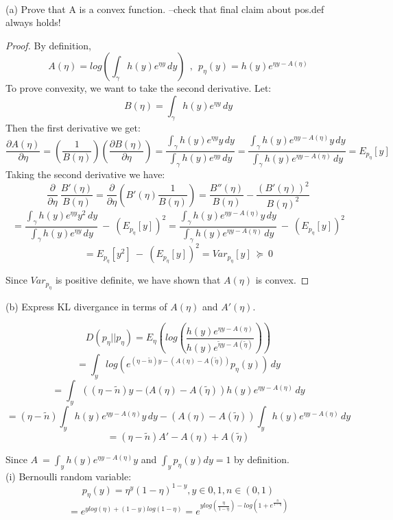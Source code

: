 \documentclass[11pt]{article}
\newenvironment{problem}[2][Problem]{\begin{trivlist}
\item[\hskip \labelsep {\bfseries #1}\hskip \labelsep {\bfseries #2.}]}{\end{trivlist}}
\begin{document}
\begin{problem}{2.2}
\text{ }\\

{\color{red}(a) Prove that A is a convex function. --check that final claim about pos.def always holds!}
\begin{proof}
By definition, 
\[ A(\eta) = log(\int_\gamma h(y)e^{\eta y}\,dy )~~,~~p_{\eta}(y) = h(y)e^{\eta y-A(\eta)} \]
To prove convexity, we want to take the second derivative. Let:
\[B(\eta) = \int_\gamma h(y)e^{\eta y}\,dy \]
Then the first derivative we get:
\[ \frac{\partial A(\eta)}{\partial \eta}
   = \left( \frac{1}{B(\eta)}\right)
     \left(\frac{\partial B(\eta)}{\partial \eta}\right) 
   = \frac{\int_\gamma h(y)e^{\eta y} y \,dy}{\int_\gamma h(y)e^{\eta y}\,dy}
   = \frac{\int_\gamma h(y)e^{\eta y - A(\eta)} y \,dy}{\int_\gamma h(y)e^{\eta y - A(\eta)}\,dy}
   =E_{p_{\eta}}[y]\]
Taking the second derivative we have:
\[ \frac{\partial}{\partial \eta}~\frac{B'(\eta)}{B(\eta)}
   = \frac{\partial}{\partial \eta}\left( B'(\eta)\frac{1}{B(\eta)}\right)
   = \frac{B''(\eta)}{B(\eta)} - \frac{(B'(\eta))^2}{B(\eta)^2}\]
\[= \frac{\int_\gamma h(y)e^{\eta y} y^2 \,dy}{\int_\gamma h(y)e^{\eta y}\,dy}~-~(E_{p_{\eta}}[y])^2
   = \frac{\int_\gamma h(y)e^{\eta y - A(\eta)} y \,dy}{\int_\gamma h(y)e^{\eta y - A(\eta)}\,dy}~-~(E_{p_{\eta}}[y])^2\]
\[ = E_{p_{\eta}}[y^2]~-~(E_{p_{\eta}}[y])^2 
   = Var_{p_{\eta}}[y] ~\succeq~0 \]

Since $Var_{p_{\eta}}$ is positive definite, we have shown that $A(\eta)$ is convex.
\end{proof}

(b) Express KL divergance in terms of $A(\eta)$ and $A'(\eta)$. 

\[ D(p_{\eta} || p_{\eta}) = E_{\eta} \left(log(\frac{h(y)e^{\eta y - A(\eta)}}{h(y)e^{\tilde \eta y - A(\tilde \eta)}})\right)\]
\[= \int_y log \left(e^{(\eta - \tilde{n})y - (A(\eta) - A(\tilde{\eta}))} p_{\eta}(y) \right) \,dy \]
\[= \int_y \left((\eta - \tilde{n})y - (A(\eta) - A(\tilde{\eta})\right) h(y)e^{\eta y - A(\eta)} \,dy \]
\[= (\eta - \tilde{n})\int_y h(y)e^{\eta y - A(\eta)}y \,dy - (A(\eta) - A(\tilde{\eta})) \int_y h(y)e^{\eta y - A(\eta)} \,dy \]
\[= (\eta - \tilde{n})A' - A(\eta) + A(\tilde{\eta}) \]

Since $A\ = \int_y h(y)e^{\eta y - A(\eta)}y $ and $\int_y p_{\eta}(y)dy = 1 $ by definition.
\\

(i) Bernoulli random variable:
\\
\[p_{\eta}(y) = \eta^{y}(1-\eta)^{1-y}, y \in {0,1}, n \in (0,1)\]
\[ = e^{ylog(\eta) + (1-y)log(1-\eta)} = e^{ylog(\frac{\eta}{1-\eta}) - log(1+e^{\frac{\eta}{1-\eta}})}\]


\end{problem}
\end{document}
